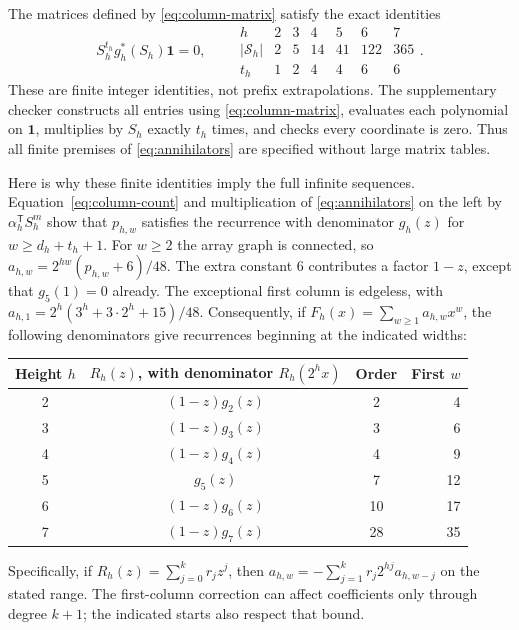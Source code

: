 \documentclass[11pt]{article}
\newcommand{\one}{\mathbf{1}}
\begin{document}
The matrices defined by \eqref{eq:column-matrix} satisfy the exact identities
\begin{equation}\label{eq:annihilators}
S_h^{t_h}g_h^*(S_h)\one=0,\qquad
\begin{array}{c|rrrrrr}
h&2&3&4&5&6&7\\\hline
|\mathcal S_h|&2&5&14&41&122&365\\
t_h&1&2&4&4&6&6
\end{array}.
\end{equation}
These are finite integer identities, not prefix extrapolations.
The supplementary checker constructs all entries using
\eqref{eq:column-matrix}, evaluates each polynomial on $\one$, multiplies
by $S_h$ exactly $t_h$ times, and checks every coordinate is zero.
Thus all finite premises of \eqref{eq:annihilators} are specified without
large matrix tables.

Here is why these finite identities imply the full infinite sequences.
Equation~\eqref{eq:column-count} and multiplication of
\eqref{eq:annihilators} on the left by
$\alpha_h^{\mathsf T}S_h^m$ show that $p_{h,w}$ satisfies the recurrence
with denominator $g_h(z)$ for $w\ge d_h+t_h+1$.
For $w\ge2$ the array graph is connected, so
$a_{h,w}=2^{hw}(p_{h,w}+6)/48$.
The extra constant $6$ contributes a factor $1-z$, except that
$g_5(1)=0$ already. The exceptional first column is edgeless, with
$a_{h,1}=2^h(3^h+3\cdot2^h+15)/48$.
Consequently, if $F_h(x)=\sum_{w\ge1}a_{h,w}x^w$, the following denominators
give recurrences beginning at the indicated widths:
\begin{center}
\begin{tabular}{cccr}
\toprule
Height $h$ & $R_h(z)$, with denominator $R_h(2^h x)$ & Order & First $w$\\\midrule
2 & $(1-z)g_2(z)$ & 2 & 4\\
3 & $(1-z)g_3(z)$ & 3 & 6\\
4 & $(1-z)g_4(z)$ & 4 & 9\\
5 & $g_5(z)$ & 7 & 12\\
6 & $(1-z)g_6(z)$ & 10 & 17\\
7 & $(1-z)g_7(z)$ & 28 & 35\\
\bottomrule
\end{tabular}
\end{center}
Specifically, if $R_h(z)=\sum_{j=0}^k r_jz^j$, then
$a_{h,w}=-\sum_{j=1}^k r_j2^{hj}a_{h,w-j}$ on the stated range.
The first-column correction can affect coefficients only through degree
$k+1$; the indicated starts also respect that bound.
\end{document}

